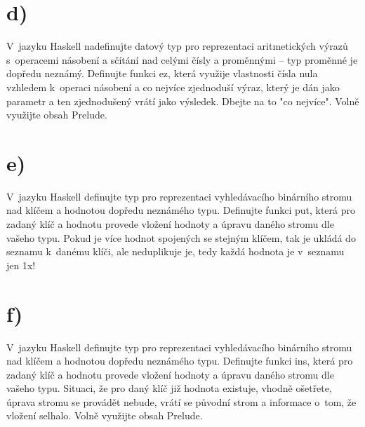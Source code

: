 \documentclass[11pt, a4paper, titlepage]{article}
\begin{document}
\section*{d)}

V~jazyku Haskell nadefinujte datový typ pro reprezentaci aritmetických výrazů s~operacemi násobení a sčítání nad celými čísly a proměnnými -- typ proměnné je dopředu neznámý. Definujte funkci ez, která využije vlastnosti čísla nula vzhledem k~operaci násobení a co nejvíce zjednoduší výraz, který je dán jako parametr a ten zjednodušený vrátí jako výsledek. Dbejte na to "co nejvíce". Volně využijte obsah Prelude.

\section*{e)}

V~jazyku Haskell definujte typ pro reprezentaci vyhledávacího binárního stromu nad klíčem a hodnotou dopředu neznámého typu. Definujte funkci put, která pro zadaný klíč a hodnotu provede vložení hodnoty a úpravu daného stromu dle vašeho typu. Pokud je více hodnot spojených se stejným klíčem, tak je ukládá do seznamu k~danému klíči, ale neduplikuje je, tedy každá hodnota je v~seznamu jen 1x!

\section*{f)}

V~jazyku Haskell definujte typ pro reprezentaci vyhledávacího binárního stromu nad klíčem a hodnotou dopředu neznámého typu. Definujte funkci ins, která pro zadaný klíč a hodnotu provede vložení hodnoty a úpravu daného stromu dle vašeho typu. Situaci, že pro daný klíč již hodnota existuje, vhodně ošetřete, úprava stromu se provádět nebude, vrátí se původní strom a informace o~tom, že vložení selhalo. Volně využijte obsah Prelude.

\end{document}
